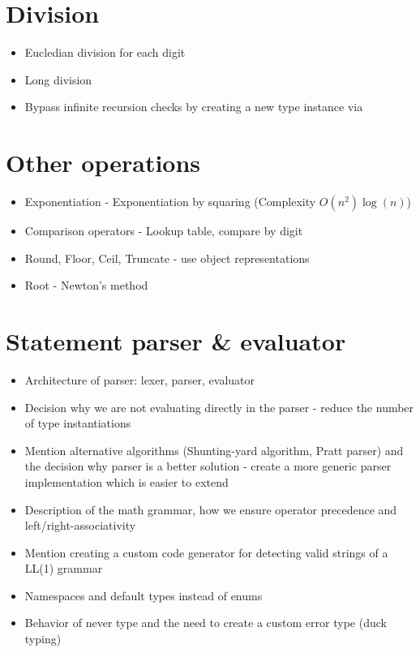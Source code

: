 \section{Division}

\begin{itemize}
  \item Eucledian division for each digit
  \item Long division
  \item Bypass infinite recursion checks by creating a new type instance via 
\end{itemize}

\section{Other operations}

\begin{itemize}
  \item Exponentiation - Exponentiation by squaring (Complexity $O(n^2)\log(n)$)
  \item Comparison operators - Lookup table, compare by digit
  \item Round, Floor, Ceil, Truncate - use object representations
  \item Root - Newton's method
\end{itemize}

\section{Statement parser \& evaluator}

\begin{itemize}
  \item Architecture of parser: lexer, parser, evaluator
  \item Decision why we are not evaluating directly in the parser - reduce the number of type instantiations
  \item Mention alternative algorithms (Shunting-yard algorithm, Pratt parser) and the decision why parser is a better solution - create a more generic parser implementation which is easier to extend
  \item Description of the math grammar, how we ensure operator precedence and left/right-associativity
  \item Mention creating a custom code generator for detecting valid strings of a LL(1) grammar
  \item Namespaces and default types instead of enums
  \item Behavior of never type and the need to create a custom error type (duck typing)
\end{itemize}


